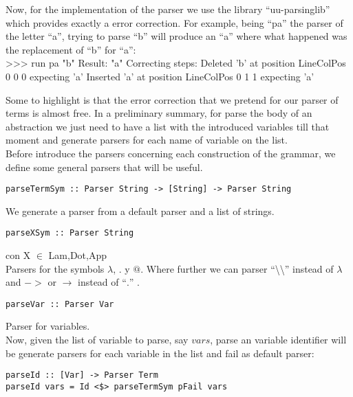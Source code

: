 \documentclass[a4paper,10pt]{article}
\newenvironment{code}{\footnotesize\verbatim}{\endverbatim\normalsize}
\begin{document}
Now, for the implementation of the parser we use the library ``uu-parsinglib''
which provides exactly a error correction. For example, being ``pa'' the parser
of the letter ``a'', trying to parse ``b'' will produce an ``a'' where what 
happened was the replacement of ``b'' for ``a'':\\

\begin{code}
 >>> run pa  "b"
     Result: "a"
     Correcting steps: 
       Deleted   'b' at position LineColPos 0 0 0 expecting 'a'
       Inserted  'a' at position LineColPos 0 1 1 expecting 'a'
\end{code}

Some to highlight is that the error correction that we pretend for our parser
of terms is almost free. In a preliminary summary, for parse the body of an 
abstraction we just need to have a list with the introduced variables till that
moment and generate parsers for each name of variable on the list.\\

Before introduce the parsers concerning each construction of the grammar, 
we define some general parsers that will be useful.

\begin{lstlisting}
parseTermSym :: Parser String -> [String] -> Parser String
\end{lstlisting}
We generate a parser from a default parser and a list of strings.

\begin{lstlisting}
parseXSym :: Parser String
\end{lstlisting} con X $\in$ {Lam,Dot,App}\\
Parsers for the symbols $\lambda$, $.$ y $@$. Where further we can
parser ``\textbackslash \textbackslash'' instead of $\lambda$ and $->$ or $\rightarrow$
instead of ``$.$'' .

\begin{lstlisting}
parseVar :: Parser Var
\end{lstlisting} Parser for variables.\\

Now, given the list of variable to parse, say $vars$, parse an variable identifier
will be generate parsers for each variable in the list and fail as default parser:

\begin{lstlisting}
parseId :: [Var] -> Parser Term
parseId vars = Id <$> parseTermSym pFail vars
\end{lstlisting}
\end{document}
